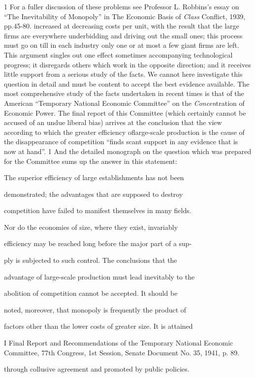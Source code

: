 \documentclass[11pt,openany]{book}
\begin{document}
1 For a fuller discussion of these problems see Professor L. Robbins's essay on ``The Inevitability of Monopoly'' in The Economic Basis of \emph{Class} Conflict, 1939, pp.45-80. increased at decreasing costs per unit, with the result that the large firms are everywhere underbidding and driving out the small ones; this process must go on till in each industry only one or at most a few giant firms are left. This argument singles out one effect sometimes accompanying technological progress; it disregards others which work in the opposite direction; and it receives little support from a serious study of the facts. We cannot here investigate this question in detail and must be content to accept the best evidence available. The most comprehensive study of the facts undertaken in recent times is that of the American ``Temporary National Economic Committee'' on the \emph{Concen}tration of Economic Power. The final report of this Committee (which certainly cannot be accused of an undue liberal bias) arrives at the conclusion that the view according to which the greater efficiency oflarge-scale production is the cause of the disappearance of competition ``finds scant support in any evidence that is now at hand''. 1 And the detailed monograph on the question which was prepared for the Committee sums up the answer in this statement:

The superior efficiency of large establishments has not been

demonstrated; the advantages that are supposed to destroy

competition have failed to manifest themselves in many fields.

Nor do the economies of size, where they exist, invariably

efficiency may be reached long before the major part of a sup-

ply is subjected to such control. The conclusions that the

advantage of large-scale production must lead inevitably to the

abolition of competition cannot be accepted. It should be

noted, moreover, that monopoly is frequently the product of

factors other than the lower costs of greater size. It is attained

I Final Report and Recommendations of the Temporary National Economic Committee, 77th Congress, 1st Session, Senate Document No. 35, 1941, p. 89.

through collusive agreement and promoted by public policies.
\end{document}
